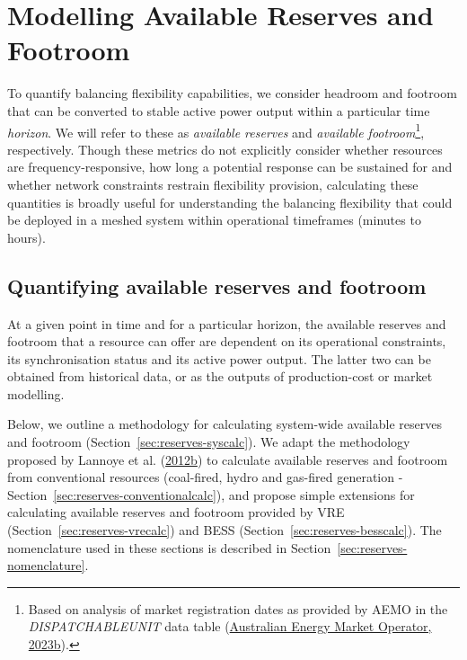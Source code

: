 \documentclass[12pt,a4paper,]{report}
\begin{document}
\hypertarget{sec:reserves-modeloverview}{%
\section{Modelling Available Reserves and
Footroom}\label{sec:reserves-modeloverview}}

To quantify balancing flexibility capabilities, we consider headroom and
footroom that can be converted to stable active power output within a
particular time \emph{horizon}. We will refer to these as
\emph{available reserves} and \emph{available footroom}\footnote{Based
  on analysis of market registration dates as provided by AEMO in the
  \emph{DISPATCHABLEUNIT} data table
  (\protect\hyperlink{ref-australianenergymarketoperatorMMSDataModel2023}{Australian
  Energy Market Operator, 2023b}).}, respectively. Though these metrics
do not explicitly consider whether resources are frequency-responsive,
how long a potential response can be sustained for and whether network
constraints restrain flexibility provision, calculating these quantities
is broadly useful for understanding the balancing flexibility that could
be deployed in a meshed system within operational timeframes (minutes to
hours).

\hypertarget{quantifying-available-reserves-and-footroom}{%
\subsection{Quantifying available reserves and
footroom}\label{quantifying-available-reserves-and-footroom}}

At a given point in time and for a particular horizon, the available
reserves and footroom that a resource can offer are dependent on its
operational constraints, its synchronisation status and its active power
output. The latter two can be obtained from historical data, or as the
outputs of production-cost or market modelling.

Below, we outline a methodology for calculating system-wide available
reserves and footroom (Section~\ref{sec:reserves-syscalc}). We adapt the
methodology proposed by Lannoye et al.
(\protect\hyperlink{ref-lannoyeEvaluationPowerSystem2012}{2012b}) to
calculate available reserves and footroom from conventional resources
(coal-fired, hydro and gas-fired generation -
Section~\ref{sec:reserves-conventionalcalc}), and propose simple
extensions for calculating available reserves and footroom provided by
VRE (Section~\ref{sec:reserves-vrecalc}) and BESS
(Section~\ref{sec:reserves-besscalc}). The nomenclature used in these
sections is described in Section~\ref{sec:reserves-nomenclature}.
\end{document}
